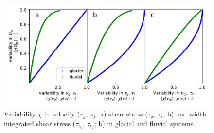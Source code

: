 \documentclass[11pt]{article}
\begin{document}
        \begin{center}
          \begin{figure}[H]
            \includegraphics[width=0.9\linewidth]{multi_run_vars.pdf}
            \caption{Variability $\chi$ in velocity ($v_g$, $v_f$; a) shear stress ($\tau_g$, $\tau_f$; b) and width-integrated shear stress ($\tau_{tg}$, $\tau_{tf}$; b)  in glacial and fluvial systems. }
            \label{fig:gammas}
          \end{figure}
        \end{center}
        
        
        
        
        
\end{document}
